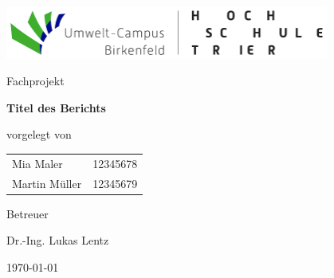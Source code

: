 %
%
%
\begin{titlepage}
\centering
%
\includegraphics[width=0.8\textwidth]{Bilder//Logo_UCB.pdf}
\par
%
\vspace{2cm}
\Large{Fachprojekt}
\par
%
\huge{\bfseries Titel des Berichts}
\par
%
\vspace{3cm}
\normalsize{vorgelegt von}
\par
%
\vspace{0.5cm}
\Large{
\begin{tabular}{ll}
Mia Maler & 12345678 \\
Martin Müller & 12345679
\end{tabular}
}
\par
%
\vspace{2cm}
\normalsize{Betreuer}
\par
\Large{Dr.-Ing. Lukas Lentz}
\par
%
\vfill
\normalsize
\today
\end{titlepage}
%
%
%
